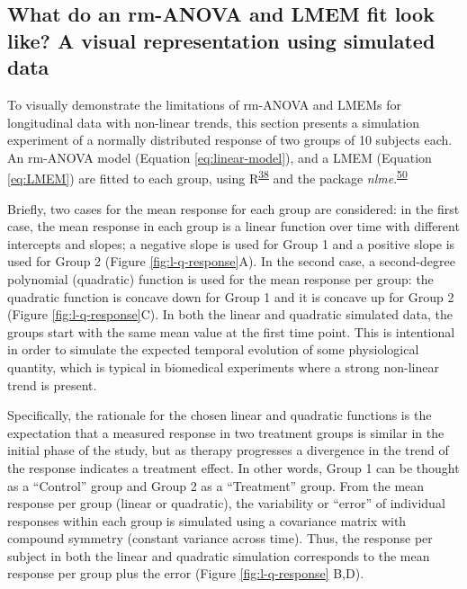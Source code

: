 \documentclass[
]{article}
\begin{document}
\hypertarget{simulation}{%
\subsection{What do an rm-ANOVA and LMEM fit look like? A visual representation using simulated data}\label{simulation}}

To visually demonstrate the limitations of rm-ANOVA and LMEMs for longitudinal data with non-linear trends, this section presents a simulation experiment of a normally distributed response of two groups of 10 subjects each. An rm-ANOVA model (Equation \eqref{eq:linear-model}), and a LMEM (Equation \eqref{eq:LMEM}) are fitted to each group, using R\textsuperscript{\protect\hyperlink{ref-r}{38}} and the package \emph{nlme}.\textsuperscript{\protect\hyperlink{ref-nlme}{50}}

Briefly, two cases for the mean response for each group are considered: in the first case, the mean response in each group is a linear function over time with different intercepts and slopes; a negative slope is used for Group 1 and a positive slope is used for Group 2 (Figure \ref{fig:l-q-response}A). In the second case, a second-degree polynomial (quadratic) function is used for the mean response per group: the quadratic function is concave down for Group 1 and it is concave up for Group 2 (Figure \ref{fig:l-q-response}C). In both the linear and quadratic simulated data, the groups start with the same mean value at the first time point. This is intentional in order to simulate the expected temporal evolution of some physiological quantity, which is typical in biomedical experiments where a strong non-linear trend is present.

Specifically, the rationale for the chosen linear and quadratic functions is the expectation that a measured response in two treatment groups is similar in the initial phase of the study, but as therapy progresses a divergence in the trend of the response indicates a treatment effect. In other words, Group 1 can be thought as a ``Control'' group and Group 2 as a ``Treatment'' group. From the mean response per group (linear or quadratic), the variability or ``error'' of individual responses within each group is simulated using a covariance matrix with compound symmetry (constant variance across time). Thus, the response per subject in both the linear and quadratic simulation corresponds to the mean response per group plus the error (Figure \ref{fig:l-q-response} B,D).
\end{document}
